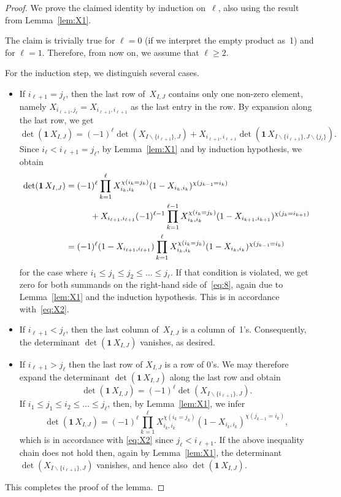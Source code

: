 \documentclass[12pt,reqno]{amsart}
\numberwithin{equation}{section}
\theoremstyle{definition}
\theoremstyle{remark}
\begin{document}
\begin{proof}
We prove the claimed identity by induction on~$\ell$, also using
the result from Lemma~\ref{lem:X1}.

The claim is trivially true for $\ell=0$ (if we interpret the empty
product as~1)
and for $\ell=1$. Therefore, from now on, we assume that $\ell\ge2$.

For the induction step, we distinguish several cases.

\begin{itemize}
\item If $i_{\ell+1}= j_\ell$, then the last row of~$X_{I,J}$ 
contains only one non-zero element, namely
$X_{i_{\ell+1},j_\ell}=X_{i_{\ell+1},i_{\ell+1}}$
as the last entry in the row. By expansion along the last row,
we get
\begin{equation} \label{eq:8} 
\det(\mathbf1\,X_{I,J}) =
(-1)^{\ell}\det(X_{I\backslash\{i_{\ell+1}\},J})+
X_{ i_{\ell+1} ,i_{\ell+1}}
\det(\mathbf1\, X_{ I\backslash
\{ i_{\ell+1} \}, J\backslash \{ j_\ell \} }).
\end{equation}
Since $i_{\ell} <  i_{\ell+1}=j_\ell$, by Lemma~\ref{lem:X1} and
by induction hypothesis, we obtain
\begin{align*}
\det(\mathbf1\,X_{I,J}) &=(-1)^{\ell}
\prod _{k=1} ^{\ell}X_{i_k,i_k}^{\chi(i_k=j_k)}
(1-X_{i_k,i_k})^{\chi(j_{k-1}=i_k)}\\
&\kern1cm
+
X_{ i_{\ell+1} ,i_{\ell+1}}
(-1)^{\ell-1}\prod _{k=1} ^{\ell-1}X_{i_k,i_k}^{\chi(i_k=j_k)}
(1-X_{i_{k+1},i_{k+1}})^{\chi(j_{k}=i_{k+1})}\\
&=(-1)^{\ell}(1-X_{i_{\ell+1},i_{\ell+1}})
\prod _{k=1} ^{\ell}X_{i_k,i_k}^{\chi(i_k=j_k)}
(1-X_{i_{k},i_{k}})^{\chi(j_{k-1}=i_{k})}
\end{align*}
for the case where $i_1\le j_1\le j_2\le\dots\le j_\ell$.
If that condition is violated,
we get zero for both summands on the right-hand side of~\eqref{eq:8},
again due to Lemma~\ref{lem:X1} and the induction hypothesis.
This is in accordance with~\eqref{eq:X2}.
\item
If $i_{\ell+1} < j_\ell$, then the last 
column of~$X_{I,J}$ is a column of~1's. Consequently, the determinant
$\det(\mathbf1\,X_{I,J})$ vanishes, as
desired.
\item
If $i_{\ell+1} > j_\ell$ then the last row of $X_{I,J}$ is a row of 0's.
We may therefore expand the determinant $\det(\mathbf1\,X_{I,J})$
along the last row and obtain
$$
\det(\mathbf1\,X_{I,J})=(-1)^{\ell}
\det(X_{I\backslash\{i_{\ell+1}\},J}).
$$
If $i_1\le j_1\le i_2\le \dots\le j_\ell$, then, by
Lemma~\ref{lem:X1}, we infer
$$
\det(\mathbf1\,X_{I,J})=(-1)^{\ell}
\prod _{k=1} ^{\ell}X_{i_k,i_k}^{\chi(i_k=j_k)}
(1-X_{i_{k},i_{k}})^{\chi(j_{k-1}=i_{k})},
$$
which is in accordance with \eqref{eq:X2} since $j_\ell<i_{\ell+1}$.
If the above inequality chain does not hold then, again by
Lemma~\ref{lem:X1}, the determinant
$\det(X_{I\backslash\{i_{\ell+1}\},J})$ vanishes, and hence also
$\det(\mathbf1\,X_{I,J})$.
\end{itemize}
This completes the proof of the lemma.
\end{proof}
\end{document}
